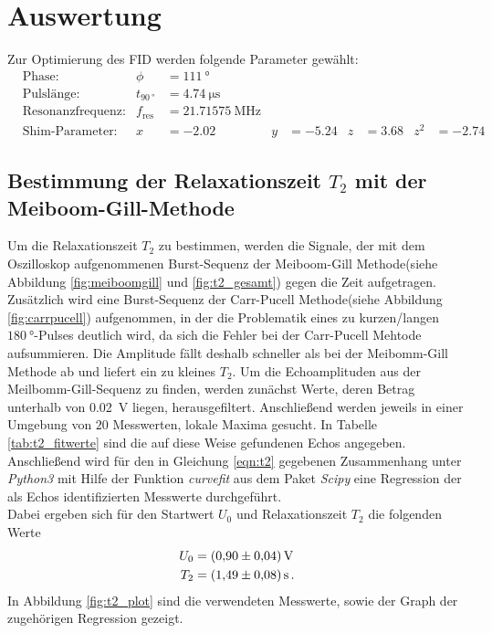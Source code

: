\newpage
\section{Auswertung}
\label{sec:Auswertung}

Zur Optimierung des FID werden folgende Parameter gewählt:
\begin{align}
&\text{Phase:} & \phi&= \SI{111}{\degree}\\
&\text{Pulslänge:} & t_{\SI{90}{\degree}}& =  \SI{4.74}{\micro\second}\\
&\text{Resonanzfrequenz:} & f_{\text{res}}&= \SI{21.71575}{\mega\hertz}\\
&\text{Shim-Parameter:} & x&=\num{-2.02} & y&=\num{-5.24} & z&=\num{3.68} & z^2&=\num{-2.74}
\end{align}

\subsection{Bestimmung der Relaxationszeit $T_{2}$ mit der Meiboom-Gill-Methode}
\label{subsec:T2}
Um die Relaxationszeit $T_{2}$ zu bestimmen, werden die Signale, der mit dem Oszilloskop aufgenommenen
Burst-Sequenz der Meiboom-Gill Methode(siehe Abbildung \ref{fig:meiboomgill} und \ref{fig:t2_gesamt}) gegen die Zeit aufgetragen.
Zusätzlich wird eine Burst-Sequenz der Carr-Pucell Methode(siehe Abbildung \ref{fig:carrpucell}) aufgenommen, in der die
Problematik eines zu kurzen/langen $\SI{180}{\degree}$-Pulses deutlich wird, da
sich die Fehler bei der Carr-Pucell Mehtode aufsummieren.
Die Amplitude fällt deshalb schneller als bei der Meibomm-Gill Methode
ab und liefert ein zu kleines $T_2$.
Um die Echoamplituden aus der Meilbomm-Gill-Sequenz zu finden, werden
zunächst Werte, deren Betrag unterhalb von \SI{0.02}{\volt} liegen, herausgefiltert.
Anschließend werden jeweils in einer Umgebung von $20$ Messwerten, lokale
Maxima gesucht.
In Tabelle \ref{tab:t2_fitwerte}
sind die auf diese Weise gefundenen Echos angegeben.
Anschließend wird für den in Gleichung \eqref{eqn:t2} gegebenen Zusammenhang unter \textit{Python3} mit Hilfe der Funktion \textit{curvefit} aus
dem Paket \textit{Scipy} eine Regression der als Echos identifizierten Messwerte durchgeführt.\\
Dabei ergeben sich für den Startwert $U_{0}$ und Relaxationszeit $T_{2}$ die folgenden Werte
\begin{align*}
  U_{0} &= \SI{0.90+-0.04}{\volt} \\
  T_{2} &= \SI{1.49+-0.08}{\second} \, .
\end{align*}
In Abbildung \ref{fig:t2_plot} sind die verwendeten Messwerte, sowie der Graph der zugehörigen Regression
gezeigt.\\


